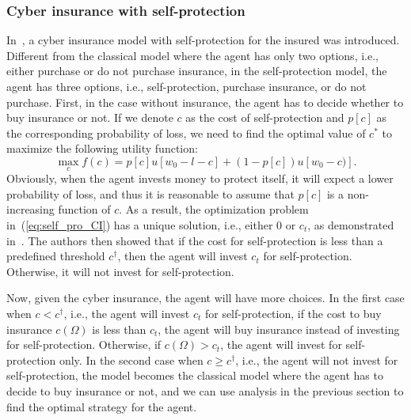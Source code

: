 \documentclass[twocolumn,10pt]{IEEEtran}
\begin{document}
\subsubsection{Cyber insurance with self-protection}
\label{subsubsection: Cyber insurance with self-protection}

In~\cite{Bolot2008Cyber}, a cyber insurance model with self-protection for the insured was introduced. Different from the classical model where the agent has only two options, i.e., either purchase or do not purchase insurance, in the self-protection model, the agent has three options, i.e., self-protection, purchase insurance, or do not purchase. First, in the case without insurance, the agent has to decide whether to buy insurance or not. If we denote $c$ as the cost of self-protection and $p[c]$ as the corresponding probability of loss, we need to find the optimal value of $c^*$ to maximize the following utility function:
\begin{equation}
\label{eq:self_pro_CI}
\max_{c} f(c) = p[c] u[w_0-l-c] + (1-p[c]) u[w_0-c)]	.
\end{equation}
Obviously, when the agent invests money to protect itself, it will expect a lower probability of loss, and thus it is reasonable to assume that $p[c]$ is a non-increasing function of $c$. As a result, the optimization problem in~(\ref{eq:self_pro_CI}) has a unique solution, i.e., either $0$ or $c_t$, as demonstrated in~\cite{Bolot2008Cyber}. The authors then showed that if the cost for self-protection is less than a predefined threshold $c^{\dagger}$, then the agent will invest $c_t$ for self-protection. Otherwise, it will not invest for self-protection. 

Now, given the cyber insurance, the agent will have more choices. In the first case when $c<c^{\dagger}$, i.e., the agent will invest $c_t$ for self-protection, if the cost to buy insurance $c(\Omega)$ is less than $c_t$, the agent will buy insurance instead of investing for self-protection. Otherwise, if $c(\Omega)> c_t$, the agent will invest for self-protection only. In the second case when $c\geq c^{\dagger}$, i.e., the agent will not invest for self-protection, the model becomes the classical model where the agent has to decide to buy insurance or not, and we can use analysis in the previous section to find the optimal strategy for the agent. 
\end{document}
